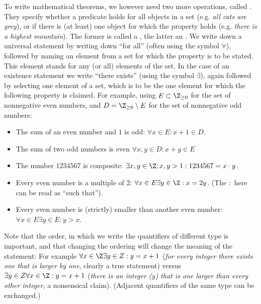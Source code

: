 To write mathematical theorems, we however need two more operations, called
. They specify whether a predicate holds for all objects
in a set (e.g. {\em all cats are grey}), or if there is (at least) one
object for which the property holds (e.g. {\em there is a highest
mountain}). The former is called a , the latter
an .
We write down a universal statement
by writing down ``for all'' (often using the symbol $\forall$), followed by
naming an element from a set for which the property is to be stated. This
element stands for any (or all) elements of the set.
In the case of an existence statement we write ``there exists'' (using the
symbol $\exists$), again followed by selecting one element of a set, which
is to be the one element for which the following property is claimed.
For example,
using $E\subset\Z_{\ge 0}$ for the set of nonnegative even numbers, and
$D=\Z_{\ge 0}\setminus E$ for the
set of nonnegative odd numbers:
\begin{itemize}
\item The sum of an even number and $1$ is odd: 
$\forall x\in E: x+1\in D$.
\item The sum of two odd numbers is even
$\forall x,y\in D:x+y\in E$
\item
The number $1234567$ is composite: $\exists x,y\in\Z; x,y>1: 1234567=x\cdot
y$.
\item
Every even number is a multiple of $2$: $\forall x\in E\exists y\in\Z:
x=2y$. (The $:$ here can be read as ``such that'').
\item 
Every even number is (strictly) smaller than another even number:
$\forall x\in E\exists y\in E:y>x$.
\end{itemize}

Note that the order, in which we write the quantifiers of different type is important, and
that changing the ordering will change the meaning of the statement: For
example $\forall x\in\Z\exists y\in Z: y=x+1$ ({\em for every integer there
exists one that is larger by one}, clearly a true statement) versus $\exists
y\in Z\forall x\in\Z: y=x+1$ ({\em there is an integer ($y$) that is one
larger than every other integer}, a nonsensical claim).
(Adjacent quantifiers of the same type can be exchanged.)
\medskip

